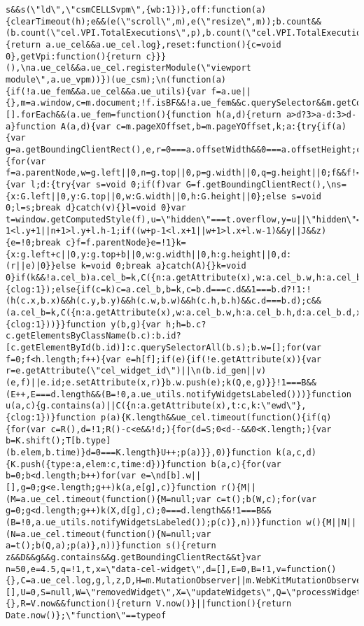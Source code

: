 \documentclass[
]{article}
\begin{document}
\begin{verbatim}
s&&s(\"ld\",\"csmCELLSvpm\",{wb:1})},off:function(a){clearTimeout(h);e&&(e(\"scroll\",m),e(\"resize\",m));b.count&&(b.count(\"cel.VPI.TotalExecutions\",p),b.count(\"cel.VPI.TotalExecutionTime\",u),b.count(\"cel.VPI.AverageExecutionTime\",u/p))},ready:function(){return a.ue_cel&&a.ue_cel.log},reset:function(){c=void 0},getVpi:function(){return c}}}(),\na.ue_cel&&a.ue_cel.registerModule(\"viewport module\",a.ue_vpm))})(ue_csm);\n(function(a){if(!a.ue_fem&&a.ue_cel&&a.ue_utils){var f=a.ue||{},m=a.window,c=m.document;!f.isBF&&!a.ue_fem&&c.querySelector&&m.getComputedStyle&&[].forEach&&(a.ue_fem=function(){function h(a,d){return a>d?3>a-d:3>d-a}function A(a,d){var c=m.pageXOffset,b=m.pageYOffset,k;a:{try{if(a){var g=a.getBoundingClientRect(),e,r=0===a.offsetWidth&&0===a.offsetHeight;c:{for(var f=a.parentNode,w=g.left||0,n=g.top||0,p=g.width||0,q=g.height||0;f&&f!==document.body;){var l;d:{try{var s=void 0;if(f)var G=f.getBoundingClientRect(),\ns={x:G.left||0,y:G.top||0,w:G.width||0,h:G.height||0};else s=void 0;l=s;break d}catch(v){}l=void 0}var t=window.getComputedStyle(f),u=\"hidden\"===t.overflow,y=u||\"hidden\"===t.overflowX,z=u||\"hidden\"===t.overflowY,J=n+q-1<l.y+1||n+1>l.y+l.h-1;if((w+p-1<l.x+1||w+1>l.x+l.w-1)&&y||J&&z){e=!0;break c}f=f.parentNode}e=!1}k={x:g.left+c||0,y:g.top+b||0,w:g.width||0,h:g.height||0,d:(r||e)|0}}else k=void 0;break a}catch(A){}k=void 0}if(k&&!a.cel_b)a.cel_b=k,C({n:a.getAttribute(x),w:a.cel_b.w,h:a.cel_b.h,d:a.cel_b.d,\nx:a.cel_b.x,y:a.cel_b.y,t:d,k:\"ewi\",cl:a.className},{clog:1});else{if(c=k)c=a.cel_b,b=k,c=b.d===c.d&&1===b.d?!1:!(h(c.x,b.x)&&h(c.y,b.y)&&h(c.w,b.w)&&h(c.h,b.h)&&c.d===b.d);c&&(a.cel_b=k,C({n:a.getAttribute(x),w:a.cel_b.w,h:a.cel_b.h,d:a.cel_b.d,x:a.cel_b.x,y:a.cel_b.y,t:d,k:\"ewi\"},{clog:1}))}}function y(b,g){var h;h=b.c?c.getElementsByClassName(b.c):b.id?[c.getElementById(b.id)]:c.querySelectorAll(b.s);b.w=[];for(var f=0;f<h.length;f++){var e=h[f];if(e){if(!e.getAttribute(x)){var r=e.getAttribute(\"cel_widget_id\")||\n(b.id_gen||v)(e,f)||e.id;e.setAttribute(x,r)}b.w.push(e);k(Q,e,g)}}!1===B&&(E++,E===d.length&&(B=!0,a.ue_utils.notifyWidgetsLabeled()))}function u(a,c){g.contains(a)||C({n:a.getAttribute(x),t:c,k:\"ewd\"},{clog:1})}function p(a){K.length&&ue_cel.timeout(function(){if(q){for(var c=R(),d=!1;R()-c<e&&!d;){for(d=S;0<d--&&0<K.length;){var b=K.shift();T[b.type](b.elem,b.time)}d=0===K.length}U++;p(a)}},0)}function k(a,c,d){K.push({type:a,elem:c,time:d})}function b(a,c){for(var b=0;b<d.length;b++)for(var e=\nd[b].w||[],g=0;g<e.length;g++)k(a,e[g],c)}function r(){M||(M=a.ue_cel.timeout(function(){M=null;var c=t();b(W,c);for(var g=0;g<d.length;g++)k(X,d[g],c);0===d.length&&!1===B&&(B=!0,a.ue_utils.notifyWidgetsLabeled());p(c)},n))}function w(){M||N||(N=a.ue_cel.timeout(function(){N=null;var a=t();b(Q,a);p(a)},n))}function s(){return z&&D&&g&&g.contains&&g.getBoundingClientRect&&t}var n=50,e=4.5,q=!1,t,x=\"data-cel-widget\",d=[],E=0,B=!1,v=function(){},C=a.ue_cel.log,g,l,z,D,H=m.MutationObserver||m.WebKitMutationObserver||\nm.MozMutationObserver,I=!!H,F,G,O=\"DOMAttrModified\",L=\"DOMNodeInserted\",J=\"DOMNodeRemoved\",N,M,K=[],U=0,S=null,W=\"removedWidget\",X=\"updateWidgets\",Q=\"processWidget\",T,V=m.performance||{},R=V.now&&function(){return V.now()}||function(){return Date.now()};\"function\"==typeof 
\end{verbatim}
\end{document}
